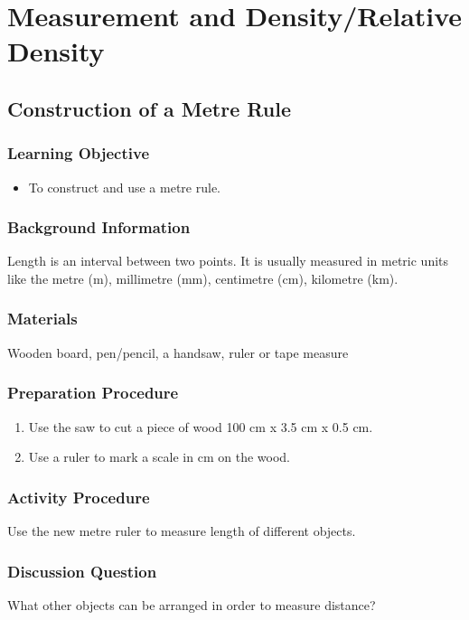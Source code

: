 \section{Measurement and Density/Relative Density}	


\subsection{Construction of a Metre Rule}
\label{sub:metrerule}

\subsubsection*{Learning Objective}
\begin{itemize}
\item{To construct and use a metre rule.} 
\end{itemize}

\subsubsection*{Background Information}
Length is an interval between two points. It is usually measured in metric units like the metre (m), millimetre (mm), centimetre (cm), kilometre (km).

\subsubsection*{Materials}
Wooden board, pen/pencil, a handsaw, ruler or tape measure

\subsubsection*{Preparation Procedure}
\begin{enumerate}
\item{Use the saw to cut a piece of wood 100 cm x 3.5 cm x 0.5 cm.} 
\item{Use a ruler to mark a scale in cm on the wood.} 
\end{enumerate}

\subsubsection*{Activity Procedure}
Use the new metre ruler to measure length of different objects.

\subsubsection*{Discussion Question}
What other objects can be arranged in order to measure distance?

